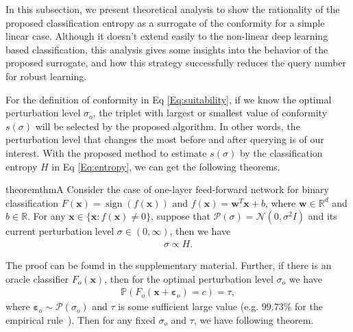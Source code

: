 \documentclass[letterpaper]{article} %
\begin{document}
In this subsection, we present theoretical analysis to show the rationality of the proposed classification entropy as a surrogate of the conformity for a simple linear case. Although it doesn't extend easily to the non-linear deep learning based classification, this analysis gives some insights into the behavior of the proposed surrogate, and how this strategy successfully reduces the query number for robust learning.

For the definition of conformity in Eq \ref{Eq:suitability}, if we know the optimal perturbation level $\sigma_o$, the triplet with largest or smallest value of conformity $s(\sigma)$  will be selected by the proposed algorithm. In other words, the perturbation level that changes the most before and after querying is of our interest. With the proposed method to estimate $s(\sigma)$ by the classification entropy $H$ in Eq \ref{Eq:entropy}, we can get the following theorems.

\begin{restatable}[]{theorem}{thmA}
	\label{theorem:thmA}
	Consider the case of one-layer feed-forward network for binary classification $F(\mathbf{x}) = \operatorname{sign}(f(\mathbf{x}))$ and $f(\mathbf{x}) = \mathbf{w}^T \mathbf{x} + b$, where $\mathbf{w} \in \mathbb{R}^d$ and $b \in \mathbb{R}$.
	For any $\mathbf{x} \in \{\mathbf{x}: f(\mathbf{x}) \neq 0\}$, suppose that $\mathcal{P}(\sigma) = \mathcal{N}(0, \sigma^{2} I)$ and its current perturbation level $\sigma \in (0, \infty)$, then we have
	\begin{align}
	\sigma \propto H.
	\end{align}
\end{restatable}

The proof can be found in the supplementary material. Further, if there is an oracle classifier $F_o(\mathbf{x})$, then for the optimal perturbation level $\sigma_o$ we have
\begin{align}
\mathbb{P}(F_o(\mathbf{x}+\boldsymbol{\varepsilon}_o) = c) = \tau,
\end{align}
where $\boldsymbol{\varepsilon}_o  \sim \mathcal{P}(\sigma_o)$ and $\tau$ is some sufficient large value (e.g. $99.73\%$ for the empirical rule~\cite{pukelsheim1994three}). Then for any fixed $\sigma_o$ and $\tau$, we have following theorem.
\end{document}
